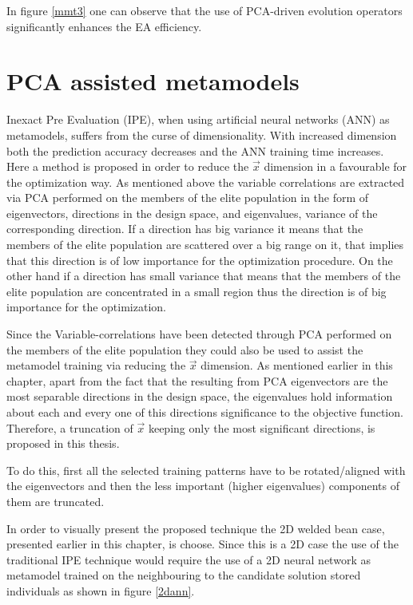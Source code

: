 In figure \ref{mmt3} one can observe that the use of PCA-driven evolution operators significantly enhances the EA efficiency.


\section{PCA assisted metamodels}
Inexact Pre Evaluation (IPE), when using artificial neural networks (ANN) as metamodels, suffers from the curse of dimensionality. With increased dimension both the prediction accuracy decreases and the ANN training time increases. Here a method is proposed in order to reduce the $\vec{x}$ dimension in a favourable for the optimization way. As mentioned above the variable correlations are extracted via PCA performed on the members of the elite population in the form of eigenvectors, directions in the design space, and eigenvalues, variance of the corresponding direction. If a direction has big variance it means that the members of the elite population are scattered over a big range on it, that implies that this direction is of low importance for the optimization procedure. On the other hand if a direction has small variance that means that the members of the elite population are concentrated in a small region thus the direction is of big importance for the optimization.        

Since the Variable-correlations have been detected through PCA performed on the members of the elite population they could also be used to assist the metamodel training via reducing the $\vec{x}$ dimension. As mentioned  earlier in this chapter, apart from the fact that the resulting from PCA eigenvectors are the most separable directions in the design space, the eigenvalues hold information about each and every one of this directions significance to the objective function. Therefore, a truncation of $\vec{x}$ keeping only the most significant directions, is proposed in this thesis.     

To do this, first all the selected training patterns have to be rotated/aligned with the eigenvectors and then the less important (higher eigenvalues) components of them are truncated.    

In order to visually present the proposed technique the 2D welded bean case, presented earlier in this chapter, is choose. Since this is a 2D case the use of the traditional IPE technique would require the use of a 2D neural network as metamodel trained on the neighbouring to the candidate solution stored individuals as shown in figure \ref{2dann}. 
    
